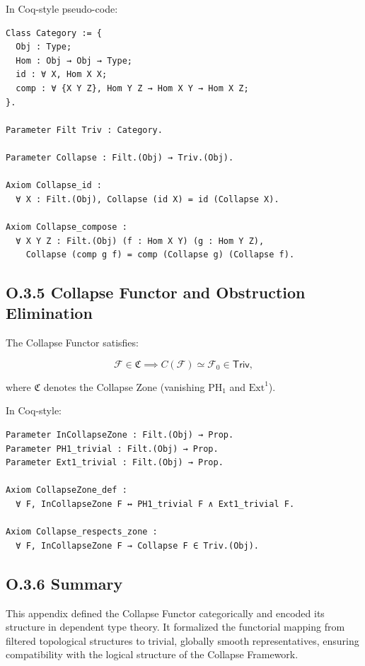 \documentclass[11pt]{article}
\begin{document}
In Coq-style pseudo-code:

\begin{lstlisting}[language=Coq]
Class Category := {
  Obj : Type;
  Hom : Obj → Obj → Type;
  id : ∀ X, Hom X X;
  comp : ∀ {X Y Z}, Hom Y Z → Hom X Y → Hom X Z;
}.

Parameter Filt Triv : Category.

Parameter Collapse : Filt.(Obj) → Triv.(Obj).

Axiom Collapse_id :
  ∀ X : Filt.(Obj), Collapse (id X) = id (Collapse X).

Axiom Collapse_compose :
  ∀ X Y Z : Filt.(Obj) (f : Hom X Y) (g : Hom Y Z),
    Collapse (comp g f) = comp (Collapse g) (Collapse f).
\end{lstlisting}

\subsection*{O.3.5 Collapse Functor and Obstruction Elimination}

The Collapse Functor satisfies:

\[
\mathcal{F} \in \mathfrak{C} \implies C(\mathcal{F}) \simeq \mathcal{F}_0 \in \mathsf{Triv},
\]

where \( \mathfrak{C} \) denotes the Collapse Zone (vanishing \( \mathrm{PH}_1 \) and \( \mathrm{Ext}^1 \)).

In Coq-style:

\begin{lstlisting}[language=Coq]
Parameter InCollapseZone : Filt.(Obj) → Prop.
Parameter PH1_trivial : Filt.(Obj) → Prop.
Parameter Ext1_trivial : Filt.(Obj) → Prop.

Axiom CollapseZone_def :
  ∀ F, InCollapseZone F ↔ PH1_trivial F ∧ Ext1_trivial F.

Axiom Collapse_respects_zone :
  ∀ F, InCollapseZone F → Collapse F ∈ Triv.(Obj).
\end{lstlisting}

\subsection*{O.3.6 Summary}

This appendix defined the Collapse Functor categorically and encoded its structure in dependent type theory.  
It formalized the functorial mapping from filtered topological structures to trivial, globally smooth representatives, ensuring compatibility with the logical structure of the Collapse Framework.
\end{document}
